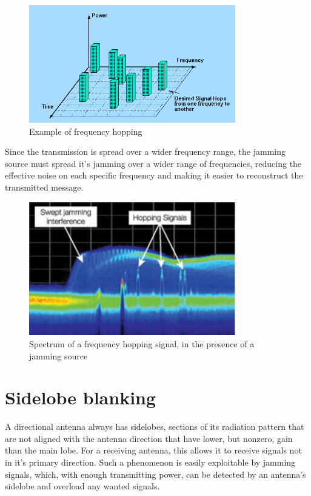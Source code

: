 \documentclass[english,purist]{ist-report}
\begin{document}
\begin{figure}[ht]
\centering
\includegraphics[width=90mm]{frequency_hopping.PNG}
\caption{Example of frequency hopping}
\label{frequency_hopping}
\end{figure} 

Since the transmission is spread over a wider frequency range, the jamming source must spread it's jamming over a wider range of frequencies, reducing the effective noise on each specific frequency and making it easier to reconstruct the transmitted message.

\begin{figure}[ht]
\centering
\includegraphics[width=90mm]{frequency_hopping_jamming.png}
\caption{Spectrum of a frequency hopping signal, in the presence of a jamming source}
\label{frequency_hopping_jamming}
\end{figure} 

\section{Sidelobe blanking}

A directional antenna always has sidelobes, sections of its radiation pattern that are not aligned with the antenna direction that have lower, but nonzero, gain than the main lobe. For a receiving antenna, this allows it to receive signals not in it's primary direction. Such a phenomenon is easily exploitable by jamming signals, which, with enough transmitting power, can be detected by an antenna's sidelobe and overload any wanted signals.
\end{document}
